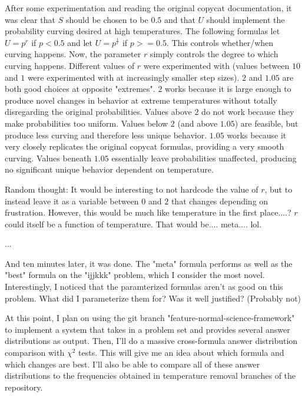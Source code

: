 \documentclass[a4paper]{article}
\begin{document}
            After some experimentation and reading the original copycat documentation, it was clear that $S$ should be chosen to be $0.5$ and that $U$ should implement the probability curving desired at high temperatures. 
            The following formulas let $U = p^r$ if $p < 0.5$ and let $U = p^\frac{1}{r}$ if $p >= 0.5$.
            This controls whether/when curving happens.
            Now, the parameter $r$ simply controls the degree to which curving happens.
            Different values of $r$ were experimented with (values between $10$ and $1$ were experimented with at increasingly smaller step sizes).
            $2$ and $1.05$ are both good choices at  opposite "extremes".
            $2$ works because it is large enough to produce novel changes in behavior at extreme temperatures without totally disregarding the original probabilities.
            Values above $2$ do not work because they make probabilities too uniform.
            Values below $2$ (and above $1.05$) are feasible, but produce less curving and therefore less unique behavior.
            $1.05$ works because it very closely replicates the original copycat formulas, providing a very smooth curving.
            Values beneath $1.05$ essentially leave probabilities unaffected, producing no significant unique behavior dependent on temperature.

            

            Random thought:
            It would be interesting to not hardcode the value of $r$, but to instead leave it as a variable between $0$ and $2$ that changes depending on frustration.
            However, this would be much like temperature in the first place....?
            $r$ could itself be a function of temperature. That would be.... meta.... lol.

            \break
            ...
            \break

            And ten minutes later, it was done.
            The "meta" formula performs as well as the "best" formula on the "ijjkkk" problem, which I consider the most novel.
            Interestingly, I noticed that the paramterized formulas aren't as good on this problem. What did I parameterize them for? Was it well justified?
            (Probably not)

            At this point, I plan on using the git branch "feature-normal-science-framework" to implement a system that takes in a problem set and provides several answer distributions as output.
            Then, I'll do a massive cross-formula answer distribution comparison with $\chi^2$ tests. This will give me an idea about which formula and which changes are best.
            I'll also be able to compare all of these answer distributions to the frequencies obtained in temperature removal branches of the repository.
            
\end{document}

